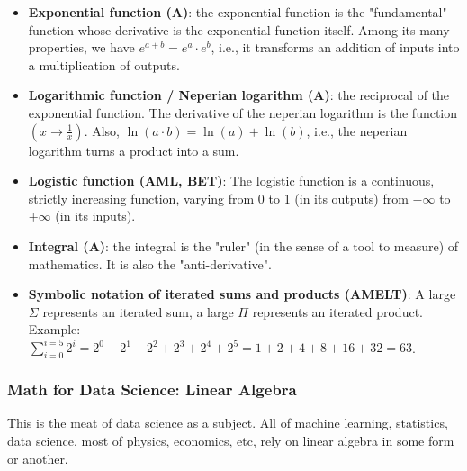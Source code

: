 \documentclass{article}
\begin{document}
\begin{itemize}
	\item \textbf{Exponential function (A)}: the exponential function is the "fundamental" function whose derivative is the exponential function itself. Among its many properties, we have $e^{a + b} = e^a \cdot e^b$, i.e., it transforms an addition of inputs into a multiplication of outputs.

	\item \textbf{Logarithmic function / Neperian logarithm (A)}: the reciprocal of the exponential function. The derivative of the neperian logarithm is the function $(x \to \frac{1}{x})$. Also, $\ln(a \cdot b) = \ln(a) + \ln(b)$, i.e., the neperian logarithm turns a product into a sum.

	\item \textbf{Logistic function (AML, BET)}: The logistic function is a continuous, strictly increasing function, varying from 0 to 1 (in its outputs) from $-\infty$ to $+\infty$ (in its inputs).

	\item \textbf{Integral (A)}: the integral is the "ruler" (in the sense of a tool to measure) of mathematics. It is also the "anti-derivative".

	\item \textbf{Symbolic notation of iterated sums and products (AMELT)}: A large $\Sigma$ represents an iterated sum, a large $\Pi$ represents an iterated product. Example: $\sum_{i = 0}^{i = 5} 2^i = 2^0 + 2^1 + 2^2 + 2^3 + 2^4 + 2^5 = 1 + 2 + 4 + 8 + 16 + 32 = 63$.

\end{itemize}



\subsubsection*{Math for Data Science: Linear Algebra}

This is the meat of data science as a subject. All of machine learning, statistics, data science, most of physics, economics, etc, rely on linear algebra in some form or another.
\end{document}
